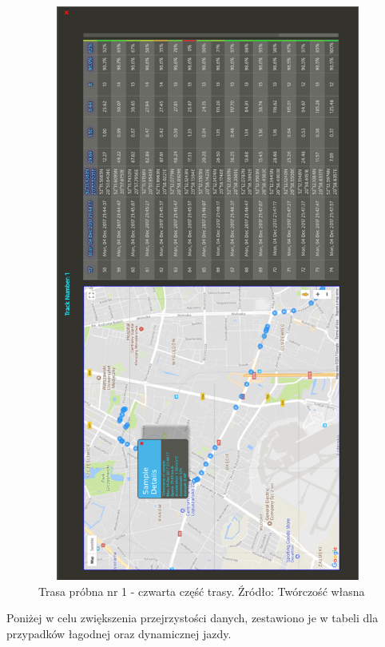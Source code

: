 \begin{figure}[H]
	\centering
	\includegraphics[height=19cm, width=13cm]{img/driving_analysis/test_track_part_4.png}
	\caption{Trasa próbna nr 1 - czwarta część trasy. Źródło: Twórczość własna}
	\label{fig:image_driving_analysis_alghoritm_track_1_part_4}
\end{figure}

Poniżej w celu zwiększenia przejrzystości danych, zestawiono je w tabeli dla przypadków łagodnej oraz dynamicznej jazdy.

